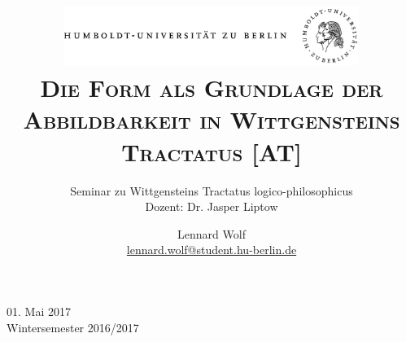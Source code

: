 \documentclass[a4paper, emulatestandardclasses, 12pt]{scrartcl}
\date{\vspace{-3ex}}
\begin{document}
\title{\vspace{5ex}
	\includegraphics*[width=0.72\textwidth]{images/hu_logo.png}\\
	\vspace{30pt}
	\scshape\LARGE{Die Form als Grundlage der Abbildbarkeit in Wittgensteins Tractatus [AT]}}
	
	\subtitle{\vspace{20pt}Seminar zu Wittgensteins Tractatus logico-philosophicus\\
	\vspace{6pt}
          Dozent: Dr. Jasper Liptow}


\author{\vspace{-4pt}Lennard Wolf\\
        \small{\href{mailto:lennard.wolf@student.hu-berlin.de}{lennard.wolf@student.hu-berlin.de}}}      

\maketitle

\vspace{\fill}

\begin{minipage}[b]{\textwidth}
    \centering
    \onehalfspacing
    \large   
    01. Mai 2017\\
    Wintersemester 2016/2017

    \vspace{-20mm} 
\end{minipage}%
\thispagestyle{empty}
\newpage
\setcounter{page}{1}
\end{document}

